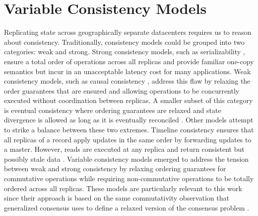 \section{Variable Consistency Models} \label{Variable Consistency}

Replicating state across geographically separate datacenters requires us to reason about consistency. Traditionally, consistency models could be grouped into two categories: weak and strong. Strong consistency models, such as serializability \cite{Herlihy1990}, ensure a total order of operations across all replicas and provide familiar one-copy semantics but incur in an unacceptable latency cost for many applications. Weak consistency models, such as causal consistency \cite{Ahamad1995}, address this flaw by relaxing the order guarantees that are ensured and allowing operations to be concurrently executed without coordination between replicas. A smaller subset of this category is eventual consistency where ordering guarantees are relaxed and state divergence is allowed as long as it is eventually reconciled \cite{Saito2005}. Other models attempt to strike a balance between these two extremes. Timeline consistency ensures that all replicas of a record apply updates in the same order by forwarding updates to a master. However, reads are executed at any replica and return consistent but possibly stale data \cite{Silberstein2008}. Variable consistency models emerged to address the tension between weak and strong consistency by relaxing ordering guarantees for commutative operations while requiring non-commutative operations to be totally ordered across all replicas. These models are particularly relevant to this work since their approach is based on the same commutativity observation that generalized consensus uses to define a relaxed version of the consensus problem \cite{Lamport2005}.\par
